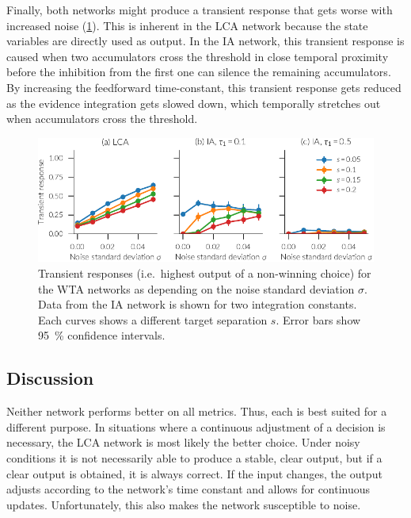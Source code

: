 Finally, both networks might produce a transient response that gets worse with increased noise (\cref{fig:ia-transient}).
This is inherent in the LCA network because the state variables are directly used as output.
In the IA network, this transient response is caused when two accumulators cross the threshold in close temporal proximity before the inhibition from the first one can silence the remaining accumulators.
By increasing the feedforward time-constant, this transient response gets reduced as the evidence integration gets slowed down, which temporally stretches out when accumulators cross the threshold.
\begin{figure}
    \centering
    \includegraphics{figures/ia-transient}
    \caption[Transient WTA responses]{Transient responses (i.e.\ highest output of a non-winning choice) for the WTA networks as depending on the noise standard deviation $\sigma$. Data from the IA network is shown for two integration constants. Each curves shows a different target separation $s$. Error bars show \SI{95}{\percent} confidence intervals.}\label{fig:ia-transient}
\end{figure}


\subsection{Discussion}
Neither network performs better on all metrics.
Thus, each is best suited for a different purpose.
In situations where a continuous adjustment of a decision is necessary, the LCA network is most likely the better choice.
Under noisy conditions it is not necessarily able to produce a stable, clear output, but if a clear output is obtained, it is always correct.
If the input changes, the output adjusts according to the network's time constant and allows for continuous updates.
Unfortunately, this also makes the network susceptible to noise.

